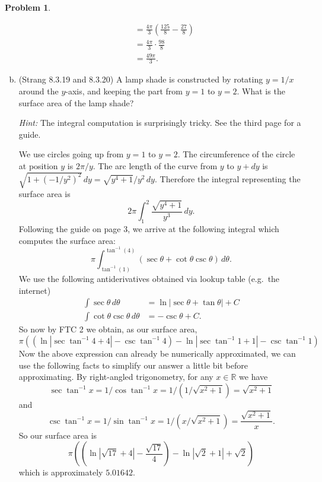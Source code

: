 \documentclass[11pt,oneside]{amsart}
\theoremstyle{definition}
\newtheorem{problem}{Problem}
\newcommand{\bR}{\mathbb{R}}
\begin{document}
\begin{problem}
\begin{enumerate}[(a)]
\begin{solution}
\[\begin{split}
                    &= \frac{4\pi}3\left( \frac{125}8-\frac{27}8 \right)\\
                    &= \frac{4\pi}3\cdot\frac{98}8\\
                    &= \frac{49\pi}3.
                \end{split}\] 
            \end{solution}
            \item (Strang 8.3.19 and 8.3.20) A lamp shade is constructed by rotating $y=1/x$ around the $y$-axis, and keeping the part from $y=1$ to $y=2$. What is the surface area of the lamp shade?
            
            \emph{Hint:} The integral computation is surprisingly tricky. See the third page for a guide.
            \begin{solution}
                We use circles going up from $y=1$ to $y=2$. The circumference of the circle at position $y$ is $2\pi/y$. The arc length of the curve from $y$ to $y+dy$ is $\sqrt{1+(-1/y^2)^2}\,dy=\sqrt{y^4+1}/y^2\,dy$. Therefore the integral representing the surface area is
                \[2\pi\int_1^2\frac{\sqrt{y^4+1}}{y^3}\,dy.\]
                Following the guide on page 3, we arrive at the following integral which computes the surface area:
                \[\pi\int_{\tan^{-1}(1)}^{\tan^{-1}(4)}(\sec\theta+\cot\theta\csc\theta)\,d\theta.\]
                We use the following antiderivatives obtained via lookup table (e.g.\ the internet)
                \begin{align*}
                    \int\sec \theta\,d\theta &=\ln|\sec\theta+\tan\theta|+C\\
                    \int\cot\theta\csc\theta\,d\theta &= -\csc\theta+C.
                \end{align*}
                So now by FTC 2 we obtain, as our surface area,
                \[\pi((\ln|\sec\tan^{-1}4+4|-\csc\tan^{-1}4)-\ln|\sec\tan^{-1}1+1|-\csc\tan^{-1}1)\]
                Now the above expression can already be numerically approximated, we can use the following facts to simplify our answer a little bit before approximating. By right-angled trigonometry, for any $x\in\bR$ we have
                \[\sec\tan^{-1}x=1/\cos\tan^{-1}x=1/(1/\sqrt{x^2+1})=\sqrt{x^2+1}\]
                and
                \[\csc\tan^{-1}x=1/\sin\tan^{-1}x=1/(x/\sqrt{x^2+1})=\frac{\sqrt{x^2+1}}x.\]
                So our surface area is
                \[\pi\left(\left(\ln|\sqrt{17}+4|-\frac{\sqrt{17}}4\right)-\ln|\sqrt2+1|+\sqrt2\right)\]
                which is approximately $5.01642$.
            \end{solution}


\end{enumerate}
\end{problem}
\end{document}
